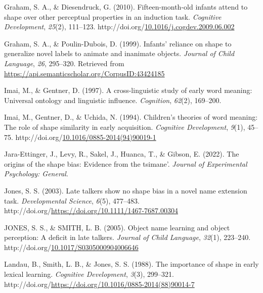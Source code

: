 \documentclass[10pt, letterpaper]{article}
\newenvironment{CSLReferences}%
  {}%
  {\par}
\begin{document}
\begin{CSLReferences}{1}{0}
\leavevmode{}%
Graham, S. A., \& Diesendruck, G. (2010). Fifteen-month-old infants
attend to shape over other perceptual properties in an induction task.
\emph{Cognitive Development}, \emph{25}(2), 111--123.
http://doi.org/\href{https://doi.org/10.1016/j.cogdev.2009.06.002}{10.1016/j.cogdev.2009.06.002}

\leavevmode{}%
Graham, S. A., \& Poulin-Dubois, D. (1999). Infants' reliance on shape
to generalize novel labels to animate and inanimate objects.
\emph{Journal of Child Language}, \emph{26}, 295--320. Retrieved from
\url{https://api.semanticscholar.org/CorpusID:43424185}

\leavevmode{}%
Imai, M., \& Gentner, D. (1997). A cross-linguistic study of early word
meaning: Universal ontology and linguistic influence. \emph{Cognition},
\emph{62}(2), 169--200.

\leavevmode{}%
Imai, M., Gentner, D., \& Uchida, N. (1994). Children's theories of word
meaning: {The} role of shape similarity in early acquisition.
\emph{Cognitive Development}, \emph{9}(1), 45--75.
http://doi.org/\href{https://doi.org/10.1016/0885-2014(94)90019-1}{10.1016/0885-2014(94)90019-1}

\leavevmode{}%
Jara-Ettinger, J., Levy, R., Sakel, J., Huanca, T., \& Gibson, E.
(2022). The origins of the shape bias: Evidence from the tsimane'.
\emph{Journal of Experimental Psychology: General}.

\leavevmode{}%
Jones, S. S. (2003). Late talkers show no shape bias in a novel name
extension task. \emph{Developmental Science}, \emph{6}(5), 477--483.
http://doi.org/\url{https://doi.org/10.1111/1467-7687.00304}

\leavevmode{}%
JONES, S. S., \& SMITH, L. B. (2005). Object name learning and object
perception: A deficit in late talkers. \emph{Journal of Child Language},
\emph{32}(1), 223--240.
http://doi.org/\href{https://doi.org/10.1017/S0305000904006646}{10.1017/S0305000904006646}

\leavevmode{}%
Landau, B., Smith, L. B., \& Jones, S. S. (1988). The importance of
shape in early lexical learning. \emph{Cognitive Development},
\emph{3}(3), 299--321.
http://doi.org/\url{https://doi.org/10.1016/0885-2014(88)90014-7}


\end{CSLReferences}
\end{document}
